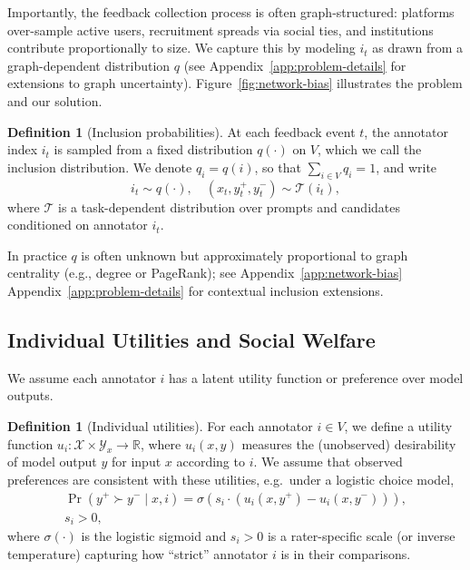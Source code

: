 \documentclass{article}
\theoremstyle{plain}
\theoremstyle{definition}
\newtheorem{definition}[theorem]{Definition}
\theoremstyle{remark}
\begin{document}
Importantly, the feedback collection process is often graph-structured: platforms over-sample active users, recruitment spreads via social ties, and institutions contribute proportionally to size. We capture this by modeling $i_t$ as drawn from a graph-dependent distribution $q$ (see Appendix~\ref{app:problem-details} for extensions to graph uncertainty). Figure~\ref{fig:network-bias} illustrates the problem and our solution.
\begin{definition}[Inclusion probabilities]
\label{def:inclusion-prob}
At each feedback event $t$, the annotator index $i_t$ is sampled from a fixed
distribution $q(\cdot)$ on $V$, which we call the inclusion
distribution. We denote $q_i = q(i)$, so that
$\sum_{i \in V} q_i = 1$, and write
\begin{equation}
    i_t \sim q(\cdot),
    \quad
    (x_t, y_t^+, y_t^-) \sim \mathcal{T}(i_t),
\end{equation}
where $\mathcal{T}$ is a task-dependent distribution over prompts and
candidates conditioned on annotator $i_t$.
\end{definition}

In practice $q$ is often unknown but approximately proportional to graph centrality (e.g., degree or PageRank); see Appendix~\ref{app:network-bias} Appendix~\ref{app:problem-details} for contextual inclusion extensions.

\subsection{Individual Utilities and Social Welfare}
\label{subsec:utilities-welfare}

We assume each annotator $i$ has a latent utility function or
preference over model outputs.

\begin{definition}[Individual utilities]
For each annotator $i \in V$, we define a utility function
$u_i : \mathcal{X} \times \mathcal{Y}_x \to \mathbb{R}$, where
$u_i(x,y)$ measures the (unobserved) desirability of model output $y$ for input
$x$ according to $i$. We assume that observed preferences are consistent with
these utilities, e.g.\ under a logistic choice model,
\begin{equation}
\begin{aligned}
    \Pr\!\left( y^+ \succ y^- \mid x, i \right)
    =
    \sigma\!\left( s_i \cdot (u_i(x,y^+) - u_i(x,y^-)) \right), \\
    s_i > 0,
\end{aligned}
\end{equation}
where $\sigma(\cdot)$ is the logistic sigmoid and $s_i > 0$ is a
rater-specific scale (or inverse temperature) capturing how
``strict'' annotator $i$ is in their comparisons.
\end{definition}
\end{document}
